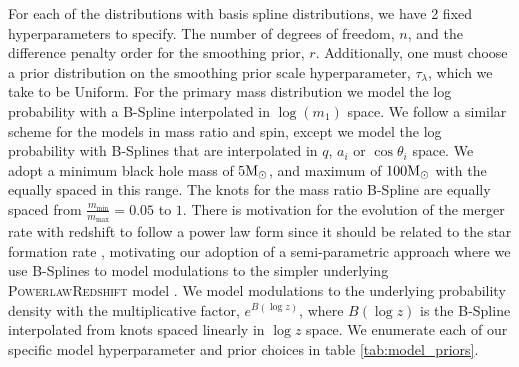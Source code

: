 For each of the distributions with basis spline distributions, we have 2 fixed hyperparameters to specify. 
The number of degrees of freedom, $n$, and the difference 
penalty order for the smoothing prior, $r$. Additionally, one must choose a prior distribution on the smoothing prior scale hyperparameter, 
$\tau_\lambda$, which we take to be Uniform. For the primary mass distribution we model the log probability with a B-Spline interpolated 
in $\log(m_1)$ space. We follow a similar scheme for the models in mass ratio and spin, except we model the log probability with 
B-Splines that are interpolated in $q$, $a_i$ or $\cos{\theta_i}$ space. We adopt a minimum black hole mass of $5{\rm M}_\odot$, 
and maximum of $100{\rm M}_\odot$ with the equally spaced in this range. The knots for the mass ratio B-Spline are equally spaced 
from $\frac{m_\mathrm{min}}{m_\mathrm{max}}=0.05$ to $1$. There is motivation for the evolution of the merger rate with redshift 
to follow a power law form since it should be related to the star formation rate \citep{Madau_2014}, 
motivating our adoption of a semi-parametric approach where we use B-Splines to model modulations to the 
simpler underlying \textsc{PowerlawRedshift} model \citep{Fishbach_2018redshift,Edelman_2022ApJ}. 
We model modulations to the underlying probability density with the multiplicative factor, $e^{B(\log z)}$, 
where $B(\log z)$ is the B-Spline interpolated from knots spaced linearly in $\log z$ space. 
We enumerate each of our specific model hyperparameter 
and prior choices in table \ref{tab:model_priors}.